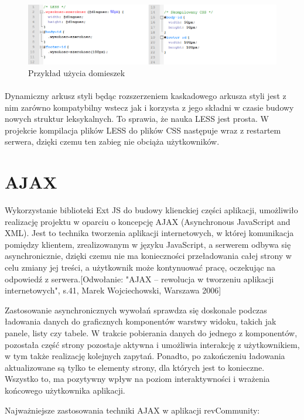 \begin{figure}[h]
	\centering
	\includegraphics[width=1.00\textwidth]{images/less2.png}
	\caption{Przykład użycia domieszek}
\end{figure}
\paragraph{}

Dynamiczny arkusz styli  będąc rozszerzeniem kaskadowego arkusza styli jest z nim zarówno kompatybilny wstecz jak i korzysta z jego składni w czasie budowy nowych struktur leksykalnych. To sprawia, że nauka LESS jest prosta.
W projekcie kompilacja plików LESS do plików CSS następuje wraz z restartem serwera, dzięki czemu ten zabieg nie obciąża użytkowników. 


\section{AJAX}
Wykorzystanie biblioteki Ext JS do budowy klienckiej części aplikacji, umożliwiło realizację projektu w oparciu o koncepcję AJAX (Asynchronous JavaScript and XML). Jest to technika tworzenia aplikacji internetowych, w której komunikacja pomiędzy klientem, zrealizowanym w języku JavaScript, a serwerem odbywa się asynchronicznie, dzięki czemu nie ma konieczności przeładowania całej strony w celu zmiany jej treści, a użytkownik może kontynuować pracę, oczekując na odpowiedź z serwera.[Odwołanie: "AJAX – rewolucja w tworzeniu aplikacji internetowych", s.41, Marek Wojciechowski, Warszawa 2006]

Zastosowanie asynchronicznych wywołań sprawdza się doskonale podczas ładowania danych do graficznych komponentów warstwy widoku, takich jak panele, listy czy tabele. W trakcie pobierania danych do jednego z komponentów, pozostała część strony pozostaje aktywna i umożliwia interakcję z użytkownikiem, w tym także realizację kolejnych zapytań. Ponadto, po zakończeniu ładowania aktualizowane są tylko te elementy strony, dla których jest to konieczne. Wszystko to, ma pozytywny wpływ na poziom interaktywności i wrażenia końcowego użytkownika aplikacji.

Najważniejsze zastosowania techniki AJAX w aplikacji revCommunity:

